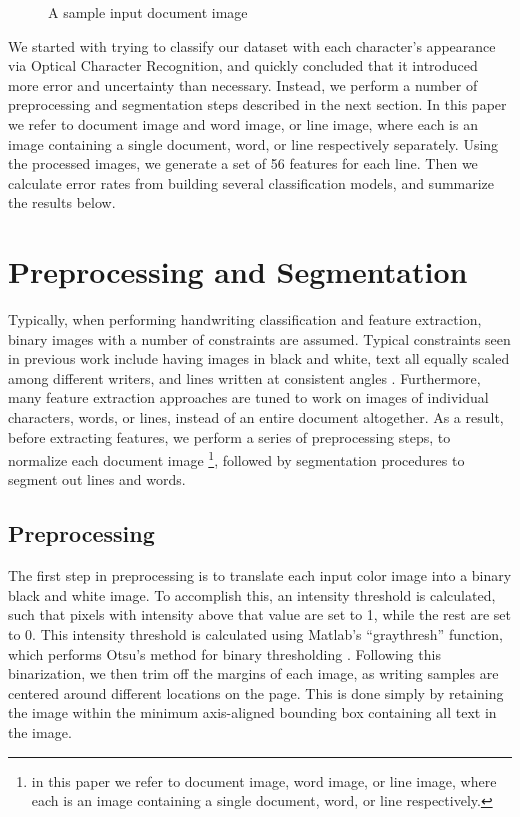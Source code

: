 \documentclass[paper=a4, fontsize=11pt]{scrartcl} %
\numberwithin{equation}{section} %
\numberwithin{figure}{section} %
\numberwithin{table}{section} %
\begin{document}
\begin{figure}
\centering {}
\caption{A sample input document image}
\label{fig:docImage}
\end{figure}

We started with trying to classify our dataset with each character's
appearance via Optical Character Recognition, and quickly concluded
that it introduced more error and uncertainty than necessary. Instead,
we perform a number of preprocessing and segmentation steps described
in the next section. In this paper we refer to document image and word
image, or line image, where each is an image containing a single
document, word, or line respectively separately. Using the processed
images, we generate a set of 56 features for each line. Then we
calculate error rates from building several classification models, and
summarize the results below.

\section{Preprocessing and Segmentation}
\label{sec:pands}
Typically, when performing handwriting classification and feature
extraction, binary images with a number of constraints are
assumed. Typical constraints seen in previous work include having
images in black and white, text all equally scaled among different
writers, and lines written at consistent angles
\cite{Preprocessing}. Furthermore, many feature extraction approaches
are tuned to work on images of individual characters, words, or lines,
instead of an entire document altogether. As a result, before
extracting features, we perform a series of preprocessing steps, to
normalize each document image \footnote{in this paper we refer to
document image, word image, or line image, where each is an image
containing a single document, word, or line respectively.}, followed
by segmentation procedures to segment out lines and words.

\subsection{Preprocessing}
The first step in preprocessing is to translate each input color image
into a binary black and white image. To accomplish this, an intensity
threshold is calculated, such that pixels with intensity above that
value are set to 1, while the rest are set to 0. This intensity
threshold is calculated using Matlab's ``graythresh'' function, which
performs Otsu's method for binary thresholding
\cite{ThresholdSelection}. Following this binarization, we then trim
off the margins of each image, as writing samples are centered around
different locations on the page. This is done simply by retaining the
image within the minimum axis-aligned bounding box containing all text
in the image.
\end{document}
